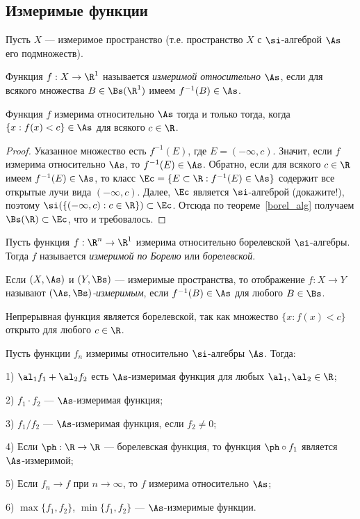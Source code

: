 \documentclass[10pt]{article}
\begin{document}
\subsection{Измеримые функции}

Пусть $X$ --- измеримое пространство (т.е. пространство $X$ с
$\si$-алгеброй $\As$ его подмножеств).

\begin{df}
Функция $f:X\to\R^1$ называется \emph{измеримой относительно $\As$},
если для всякого множества $B\in\Bs(\R^1)$ имеем $f^{-1}(B)\in\As$.
\end{df}

\begin{theorem}\label{measurable}
Функция $f$ измерима относительно $\As$ тогда и только тогда, когда
$\{x:f(x)<c\}\in\As$ для всякого $c\in\R$.
\end{theorem}

\begin{proof}
Указанное множество есть $f^{-1}(E)$, где $E=(-\infty,c)$. Значит,
если $f$ измерима относительно $\As$, то $f^{-1}(E)\in\As$. Обратно,
если для всякого $c\in\R$ имеем $f^{-1}(E)\in\As$, то класс
$\Ec=\{E\subset \R:f^{-1}(E)\in\As\}$ содержит все открытые лучи
вида $(-\infty,c)$. Далее, $\Ec$ является $\si$-алгеброй
(докажите!), поэтому $\si(\{(-\infty, c):c\in\R\})\subset\Ec$.
Отсюда по теореме~\ref{borel_alg} получаем $\Bs(\R)\subset\Ec$, что
и требовалось.
\end{proof}

Пусть функция $f:\R^n\to\R^1$ измерима относительно борелевской
$\si$-алгебры. Тогда $f$ называется \emph{измеримой по Борелю} или
\emph{борелевской}.

Если $(X,\As)$ и $(Y,\Bs)$ --- измеримые пространства, то
отображение $f: X\to Y$ называют \emph{$(\As,\Bs)$-измеримым}, если
$f^{-1}(B)\in\As$ для любого $B\in\Bs$.

\begin{note}
Непрерывная функция является борелевской, так как множество
$\{x:f(x)<c\}$ открыто для любого $c\in\R$.
\end{note}

\begin{theorem}\label{measureable}
Пусть функции $f_n$ измеримы относительно $\si$-алгебры $\As$.
Тогда:

1) $\al_1f_1+\al_2f_2$ есть $\As$-измеримая функция для любых
$\al_1,\al_2\in\R$;

2) $f_1\cdot f_2$ --- $\As$-измеримая функция;

3) $f_1/f_2$ --- $\As$-измеримая функция, если $f_2\ne0$;

4) Если $\ph:\R\to\R$ --- борелевская функция, то функция $\ph\circ
f_1$ является $\As$-измеримой;

5) Если $f_n\to f$ при $n\to\infty$, то $f$ измерима относительно
$\As$;

6) $\max\{f_1,f_2\}$, $\min\{f_1,f_2\}$ --- $\As$-измеримые функции.
\end{theorem}
\end{document}
